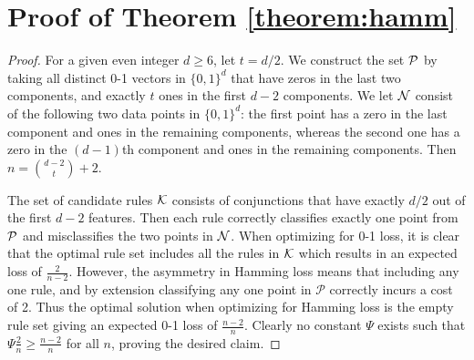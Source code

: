 \documentclass[twoside,11pt]{article}
\begin{document}
\section{Proof of Theorem \ref{theorem:hamm}} \label{app:hamming_theorem}

\begin{proof}
For a given even integer $d \ge 6$, let $t = d/2$.
We construct the set $\cal P$ by taking all distinct 0-1 vectors in $\{0,1\}^d$ that have zeros in the last two components, and exactly $t$ ones in the first $d-2$ components.
We let $\cal N$ consist of the following two data points in $\{0,1\}^d$: the first point has a zero in the last component and ones in the remaining components, whereas the second one has a zero in the $(d-1)$th component and ones in the remaining components.
Then $n = \binom{d-2}{t} + 2$.

The set of candidate  rules $\cal K$ consists of  conjunctions that have exactly $d/2$ out of the first $d-2$ features.
Then each rule correctly classifies exactly one point from $\cal P$ and misclassifies the two points in $\cal N$.
 When optimizing for 0-1 loss, it is clear that the optimal rule set includes all the rules in $\cal K$ which results in an expected loss of $\frac{2}{n-2}$. However, the asymmetry in Hamming loss means that including any one rule, and by extension classifying any one point in $\mathcal{P}$ correctly incurs a cost of 2. Thus the optimal solution when optimizing for Hamming loss is the empty rule set giving an expected 0-1 loss of $\frac{n-2}{n}$. Clearly no constant $\Psi$ exists such that $\Psi\frac{2}{n} \geq \frac{n-2}{n}$ for all $n$, proving the desired claim. 
\end{proof}
\end{document}
